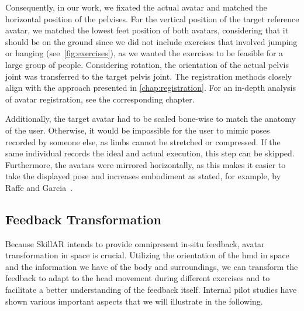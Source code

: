 Consequently, in our work, we fixated the actual avatar and matched the horizontal position of the pelvises. For the vertical position of the target reference avatar, we matched the lowest feet position of both avatars, considering that it should be on the ground since we did not include exercises that involved jumping or hanging (see~\autoref{fig:exercises}), as we wanted the exercises to be feasible for a large group of people. Considering rotation, the orientation of the actual pelvis joint was transferred to the target pelvis joint. The registration methods closely align with the approach presented in \autoref{chap:registration}. For an in-depth analysis of avatar registration, see the corresponding chapter.

Additionally, the target avatar had to be scaled bone-wise to match the anatomy of the user. Otherwise, it would be impossible for the user to mimic poses recorded by someone else, as limbs cannot be stretched or compressed. If the same individual records the ideal and actual execution, this step can be skipped. Furthermore, the avatars were mirrored horizontally, as this makes it easier to take the displayed pose and increases embodiment as stated, for example, by Raffe and Garcia~\cite{raffe2018combining}.

\subsection{Feedback Transformation \label{sec:transformation}}
Because SkillAR intends to provide omnipresent in-situ feedback, avatar transformation in space is crucial. Utilizing the orientation of the \acrshort{hmd} in space and the information we have of the body and surroundings, we can transform the feedback to adapt to the head movement during different exercises and to facilitate a better understanding of the feedback itself. Internal pilot studies have shown various important aspects that we will illustrate in the following.

